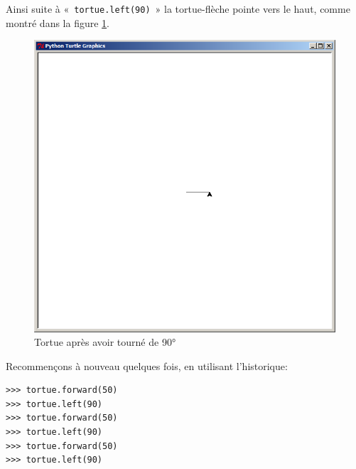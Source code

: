 Ainsi suite à «~\texttt{tortue.left(90)}~»  la tortue-flèche pointe vers le haut, comme montré dans la figure \ref{fig:90l}.
\begin{figure}[h!]
\centering
\includegraphics[scale=0.3]{images/90l.png}
\caption{Tortue après avoir tourné de 90°}
\label{fig:90l}
\end{figure}

Recommençons à nouveau quelques fois, en utilisant l'historique:

\begin{Verbatim}[frame=single,rulecolor=\color{mbleu}, label=à taper]
>>> tortue.forward(50)
>>> tortue.left(90)
>>> tortue.forward(50)
>>> tortue.left(90)
>>> tortue.forward(50)
>>> tortue.left(90)
\end{Verbatim}

